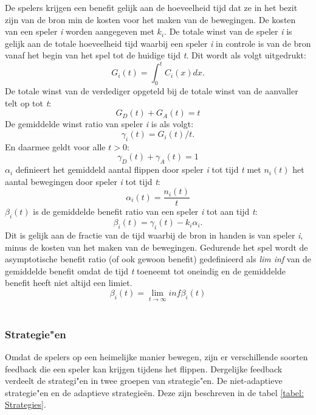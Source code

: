 \documentclass[master=cws, masteroption=vs,english]{kulemt}
\begin{document}
\begin{abstract*}
De spelers krijgen een benefit gelijk aan de hoeveelheid tijd dat ze in het bezit zijn van de bron min de kosten voor het maken van de bewegingen. De kosten van een speler \textit{i} worden aangegeven met $ k_{i} $.
De totale winst van de speler \textit{i} is gelijk aan de totale hoeveelheid tijd waarbij een speler \textit{i} in controle is van de bron vanaf het begin van het spel tot de huidige tijd \textit{t}. Dit wordt als volgt uitgedrukt:
\begin{equation}
G_{i}(t) = \int_0^t \! C_{i}(x) dx.
\end{equation}
De totale winst van de verdediger opgeteld bij de totale winst van de aanvaller telt op tot \textit{t}:
\begin{equation} 
G_{D}(t) + G_{A}(t) = t
\end{equation}
De gemiddelde winst ratio van speler \textit{i} is als volgt:
\begin{equation}
\gamma_{i}(t) = G_{i}(t) / t.
\end{equation}
En daarmee geldt voor alle $ t> 0 $:
\begin{equation} 
\gamma_{D}(t) + \gamma_{A}(t) = 1
\end{equation}
$\alpha_{i}$ definieert het gemiddeld aantal flippen door speler \textit{i} tot tijd \textit{t} met $n_{i}(t)$ het aantal bewegingen door speler \textit{i} tot tijd \textit{t}:
\begin{equation}
\alpha_{i}(t) = \dfrac{n_{i}(t)}{t}
\end{equation}
$ \beta_{i}(t) $ is de gemiddelde benefit ratio van een speler \textit{i} tot aan tijd \textit{t}:
\begin{equation}
\beta_{i}(t) = \gamma_{i}(t) - k_{i} \alpha_{i}.
\end{equation}
Dit is gelijk aan de fractie van de tijd waarbij de bron in handen is van speler \textit{i}, minus de kosten van het maken van de bewegingen. 
Gedurende het spel wordt de asymptotische benefit ratio (of ook gewoon benefit) gedefinieerd als \textit{lim inf} van de gemiddelde benefit omdat de tijd \textit{t} toeneemt tot oneindig en de gemiddelde benefit heeft niet altijd een limiet.
\begin{equation}
\beta_{i} (t) = \lim_{t \to \infty } inf \beta_{i}(t)
\end{equation}
\\


\subsubsection{Strategie"en}
Omdat de spelers op een heimelijke manier bewegen, zijn er verschillende soorten feedback die een speler kan krijgen tijdens het flippen. Dergelijke feedback verdeelt de strategi"en in twee groepen van strategie"en. De niet-adaptieve strategie"en en de adaptieve strategie\"en. Deze zijn beschreven in de tabel \ref{tabel: Strategies}. \\


\end{abstract*}
\end{document}
